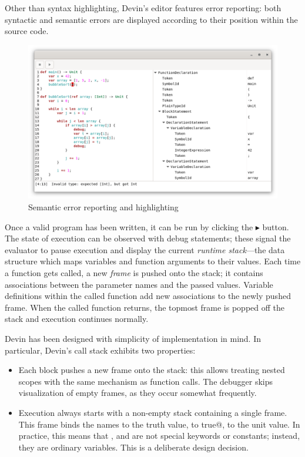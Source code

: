 \documentclass[UdineBachThesis,american,11pt]{PhdThesis}
\begin{document}
  Other than syntax highlighting, Devin's editor features error reporting: both
  syntactic and semantic errors are displayed according to their position within
  the source code.

  \begin{figure}[h]
    \centering
    \includegraphics[width=\textwidth]{4.png}
    \caption{Semantic error reporting and highlighting}
  \end{figure}

  Once a valid program has been written, it can be run by clicking the
  $\blacktriangleright$ button. The state of execution can be observed with
  debug statements; these signal the evaluator to pause execution and display
  the current \emph{runtime stack}---the data structure which maps variables and
  function arguments to their values. Each time a function gets called, a new
  \emph{frame} is pushed onto the stack; it contains associations between the
  parameter names and the passed values. Variable definitions within the called
  function add new associations to the newly pushed frame. When the called
  function returns, the topmost frame is popped off the stack and execution
  continues normally.

  Devin has been designed with simplicity of implementation in mind. In
  particular, Devin's call stack exhibits two properties:

  \begin{itemize}
    \item Each block pushes a new frame onto the stack: this allows treating
    nested scopes with the same mechanism as function calls. The debugger skips
    visualization of empty frames, as they occur somewhat frequently.

    \item Execution always starts with a non-empty stack containing a single
    frame. This frame binds the names \lstinline@true@ to the truth value,
    \lstinline@false@ to \lstinline@not true@, \lstinline@unit@ to the unit
    value. In practice, this means that \lstinline@true@, \lstinline@false@ and
    \lstinline@unit@ are not special keywords or constants; instead, they are
    ordinary variables. This is a deliberate design decision.
  \end{itemize}
\end{document}
